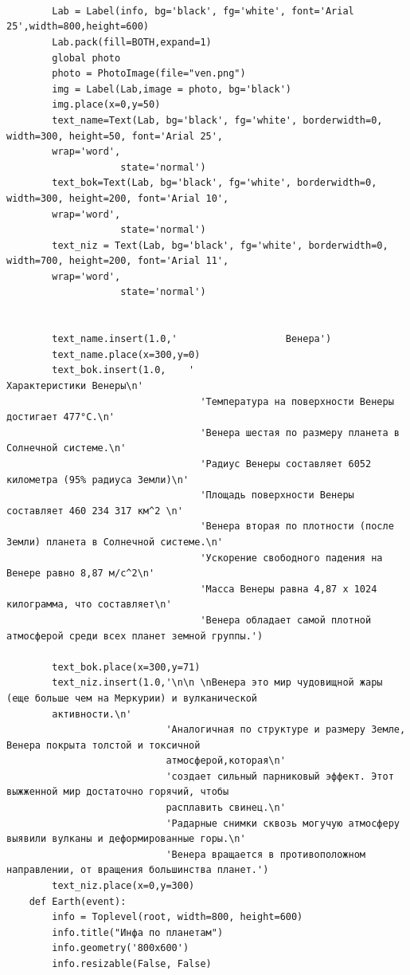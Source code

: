 \documentclass[11pt,a4paper]{report}
\begin{document}
\begin{verbatim}
    
        
    
        Lab = Label(info, bg='black', fg='white', font='Arial 25',width=800,height=600)  
        Lab.pack(fill=BOTH,expand=1)
        global photo
        photo = PhotoImage(file="ven.png")
        img = Label(Lab,image = photo, bg='black')
        img.place(x=0,y=50)
        text_name=Text(Lab, bg='black', fg='white', borderwidth=0, width=300, height=50, font='Arial 25', 
        wrap='word',
                    state='normal')  
        text_bok=Text(Lab, bg='black', fg='white', borderwidth=0, width=300, height=200, font='Arial 10', 
        wrap='word',
                    state='normal')  
        text_niz = Text(Lab, bg='black', fg='white', borderwidth=0, width=700, height=200, font='Arial 11', 
        wrap='word',
                    state='normal')  
    
       
        text_name.insert(1.0,'                   Венера')
        text_name.place(x=300,y=0)
        text_bok.insert(1.0,    '                                           Характеристики Венеры\n' 
                                  'Температура на поверхности Венеры достигает 477°C.\n'
                                  'Венера шестая по размеру планета в Солнечной системе.\n'
                                  'Радиус Венеры составляет 6052 километра (95% радиуса Земли)\n'
                                  'Площадь поверхности Венеры составляет 460 234 317 км^2 \n'
                                  'Венера вторая по плотности (после Земли) планета в Солнечной системе.\n'
                                  'Ускорение свободного падения на Венере равно 8,87 м/c^2\n'
                                  'Масса Венеры равна 4,87 х 1024 килограмма, что составляет\n'
                                  'Венера обладает самой плотной атмосферой среди всех планет земной группы.')    
        
        text_bok.place(x=300,y=71)        
        text_niz.insert(1.0,'\n\n \nВенера это мир чудовищной жары (еще больше чем на Меркурии) и вулканической 
        активности.\n'
                            'Аналогичная по структуре и размеру Земле, Венера покрыта толстой и токсичной 
                            атмосферой,которая\n'
                            'создает сильный парниковый эффект. Этот выжженной мир достаточно горячий, чтобы 
                            расплавить свинец.\n'
                            'Радарные снимки сквозь могучую атмосферу выявили вулканы и деформированные горы.\n'
                            'Венера вращается в противоположном направлении, от вращения большинства планет.')
        text_niz.place(x=0,y=300)
    def Earth(event):  
        info = Toplevel(root, width=800, height=600)
        info.title("Инфа по планетам")
        info.geometry('800x600')
        info.resizable(False, False)  
        

\end{verbatim}
\end{document}
